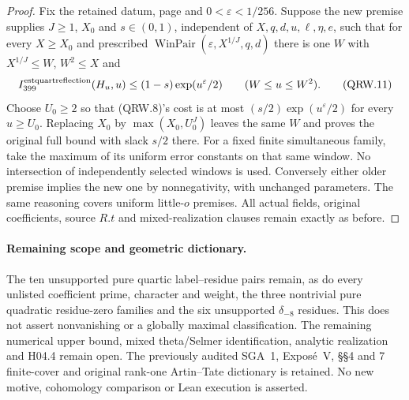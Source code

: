 \begin{proof}
Fix the retained datum, page and $0<\varepsilon<1/256$.
Suppose the new premise supplies $J\geq1$, $X_0$ and
$s\in(0,1)$, independent of $X,q,d,u,\ell,\eta,e$, such that
for every $X\geq X_0$ and prescribed
$\operatorname{WinPair}(\varepsilon,X^{1/J},q,d)$ there is
one $W$ with $X^{1/J}\leq W$, $W^2\leq X$ and
\[
 I_{399}^{\rm estquartreflection}(H_u,u)
       \leq(1-s)\exp(u^\varepsilon/2)\qquad(W\leq u\leq W^2).
 \tag{QRW.11}
\]
Choose $U_0\geq2$ so that (QRW.8)'s cost is at most
$(s/2)\exp(u^\varepsilon/2)$ for every $u\geq U_0$.
Replacing $X_0$ by $\max(X_0,U_0^J)$ leaves the same $W$
and proves the original full bound with slack $s/2$ there.
For a fixed finite simultaneous family, take the maximum of
its uniform error constants on that same window.
No intersection of independently selected windows is used.
Conversely either older premise implies the new one by
nonnegativity, with unchanged parameters.
The same reasoning covers uniform little-$o$ premises.
All actual fields, original coefficients, source $R.t$ and
mixed-realization clauses remain exactly as before.
\end{proof}

\paragraph{Remaining scope and geometric dictionary.}
The ten unsupported pure quartic label--residue pairs remain,
as do every unlisted coefficient prime, character and weight,
the three nontrivial pure quadratic residue-zero families and
the six unsupported $\delta_{-8}$ residues.
This does not assert nonvanishing or a globally maximal classification.
The remaining numerical upper bound, mixed theta/Selmer identification,
analytic realization and H04.4 remain open.
The previously audited SGA~1, Expos\'e~V, \S\S4 and 7 finite-cover
and original rank-one Artin--Tate dictionary is retained.
No new motive, cohomology comparison or Lean execution is asserted.
